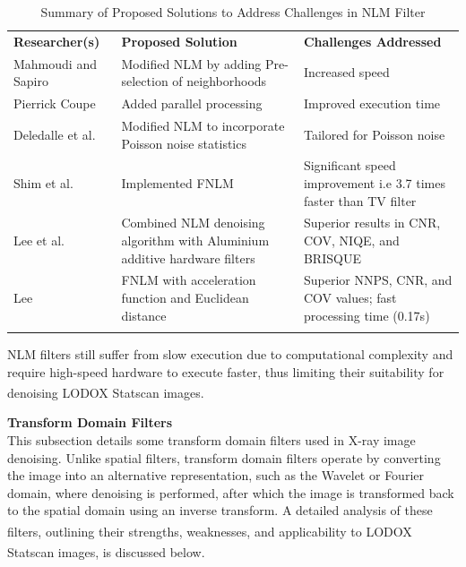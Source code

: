 \begin{center}
\small
\setlength{\arrayrulewidth}{1mm} %
\setlength{\tabcolsep}{6pt} %
\renewcommand{\arraystretch}{1.5} %

\begin{longtable}{ p{}  p{}  p{} }
\rowcolor[HTML]{D3D3D3} 
\textbf{Researcher(s)} & \textbf{Proposed Solution} & \textbf{Challenges Addressed} \\
\rowcolor[HTML]{FFFFFF} 
Mahmoudi and Sapiro \cite{1542113} & Modified \gls{NLM} by adding Pre-selection of neighborhoods & Increased speed \\
\rowcolor[HTML]{F3F3F3} 
Pierrick Coupe \cite{coupe_fast_2006} & Added parallel processing & Improved execution time \\
\rowcolor[HTML]{FFFFFF} 
Deledalle et al. \cite{5653394} & Modified \gls{NLM} to incorporate Poisson noise statistics & Tailored for Poisson noise \\
\rowcolor[HTML]{F3F3F3} 
Shim et al. \cite{shim_feasibility_2018} & Implemented \gls{FNLM} & Significant speed improvement i.e 3.7 times faster than \gls{TV} filter \\
\rowcolor[HTML]{FFFFFF} 
Lee et al. \cite{lee_impact_2022} & Combined \gls{NLM} denoising algorithm with Aluminium additive hardware filters & Superior results in \gls{CNR}, \gls{COV}, \gls{NIQE}, and \gls{BRISQUE} \\
\rowcolor[HTML]{F3F3F3} 
Lee \cite{lee_x-ray_2018} & \gls{FNLM} with acceleration function and Euclidean distance & Superior \gls{NNPS}, \gls{CNR}, and \gls{COV} values; fast processing time (0.17s) \\
\caption{Summary of Proposed Solutions to Address Challenges in \gls{NLM} Filter}
\label{tab:NLM}

\end{longtable}
\end{center}

\gls{NLM} filters still suffer from slow execution due to computational complexity and require high-speed hardware to execute faster, thus limiting their suitability for denoising LODOX\textsuperscript{\textregistered} Statscan\textsuperscript{\textregistered} images. 

\textbf{Transform Domain Filters} \\
This subsection details some transform domain filters used in X-ray image denoising. Unlike spatial filters, transform domain filters operate by converting the image into an alternative representation, such as the Wavelet or Fourier domain, where denoising is performed, after which the image is transformed back to the spatial domain using an inverse transform. A detailed analysis of these filters, outlining their strengths, weaknesses, and applicability to LODOX\textsuperscript{\textregistered} Statscan\textsuperscript{\textregistered} images, is discussed below. 

